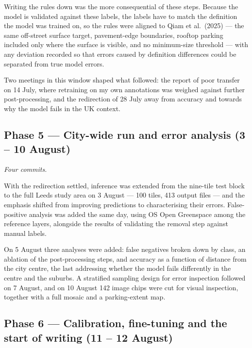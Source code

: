 Writing the rules down was the more consequential of these steps. Because the model is validated against these labels, the labels have to match the definition the model was trained on, so the rules were aligned to Qiam et al.~(2025) --- the same off-street surface target, pavement-edge boundaries, rooftop parking included only where the surface is visible, and no minimum-size threshold --- with any deviation recorded so that errors caused by definition differences could be separated from true model errors.

Two meetings in this window shaped what followed: the report of poor transfer on 14 July, where retraining on my own annotations was weighed against further post-processing, and the redirection of 28 July away from accuracy and towards why the model fails in the UK context.

\hypertarget{phase-5-city-wide-run-and-error-analysis-3-10-august}{%
\subsection*{Phase 5 --- City-wide run and error analysis (3 -- 10 August)}\label{phase-5-city-wide-run-and-error-analysis-3-10-august}}

\emph{Four commits.}

With the redirection settled, inference was extended from the nine-tile test block to the full Leeds study area on 3 August --- 100 tiles, 413 output files --- and the emphasis shifted from improving predictions to characterising their errors. False-positive analysis was added the same day, using OS Open Greenspace among the reference layers, alongside the results of validating the removal step against manual labels.

On 5 August three analyses were added: false negatives broken down by class, an ablation of the post-processing steps, and accuracy as a function of distance from the city centre, the last addressing whether the model fails differently in the centre and the suburbs. A stratified sampling design for error inspection followed on 7 August, and on 10 August 142 image chips were cut for visual inspection, together with a full mosaic and a parking-extent map.

\hypertarget{phase-6-calibration-fine-tuning-and-the-start-of-writing-11-12-august}{%
\subsection*{Phase 6 --- Calibration, fine-tuning and the start of writing (11 -- 12 August)}\label{phase-6-calibration-fine-tuning-and-the-start-of-writing-11-12-august}}

